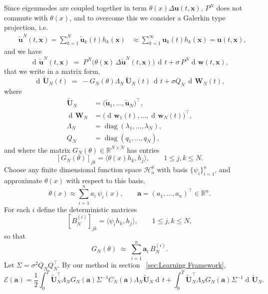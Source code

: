 \documentclass[11pt]{article} %
\def\rvu{{\mathbf{i}}}
\def\rvu{{\mathbf{u}}}
\def\rvw{{\mathbf{w}}}
\def\rvW{{\mathbf{W}}}
\def\rvx{{\mathbf{x}}}
\def\va{{\bm{a}}}
\def\gH{{\mathcal{H}}}
\newcommand{\R}{\mathbb{R}}
\DeclareMathOperator{\dif}{d \!}        %
\def\rvU{{\mathbf{U}}}
\newcommand{\inp}[1]{\langle #1 \rangle}
\newcommand{\loss}{\mathcal{E}}
\begin{document}
Since eigenmodes are coupled together in term $\theta(x)\Delta\rvu(t,\rvx)$, $P^N$ does not commute with $\theta(x)$, and to overcome this we consider a Galerkin type projection, i.e.
 \[
 \begin{aligned}
 &\tilde\rvu^N(t, \rvx) = \sum_{k = 1}^N\tilde\rvu_k(t)h_k(\rvx) &\approx \sum_{k = 1}^{\infty}\rvu_k(t)h_k(\rvx) = \rvu(t, \rvx), 
 \end{aligned}
 \]
and we have 
\begin{equation}\label{eq: Galerkin }
  \dif\tilde\rvu^{N}(t, \rvx)
  \;=\;
  P^{N}\!\bigl(\theta(\rvx)\,\Delta\tilde\rvu^N(t,\rvx)\bigr)\,\dif t
  +
  \sigma\,P^{N}\dif\rvw(t,\rvx),
\end{equation}
that we write in a matrix form,
\begin{equation}\label{eq:OU_tilde}
  \dif\tilde\rvU_N(t)
  \;=\;
  -G_{N}(\theta)\Lambda_{N}\,\tilde\rvU_N(t)\,\dif t
  + \sigma Q_{N}\,\dif\rvW_N(t),
\end{equation}
where
\begin{align}
\tilde\rvU_N &= \bigl(\tilde\rvu_{1},\dots,\tilde\rvu_{N}\bigr)^{\!\intercal}, \\
\dif\rvW_N &= \bigl(\dif\rvw_{1}(t),\dots,\dif\rvw_{N}(t)\bigr)^{\!\intercal}, \\
\Lambda_N &= \operatorname{diag}(\lambda_{1},\dots,\lambda_{N}), \\
Q_N &= \operatorname{diag}(q_{1},\dots,q_{N}),
\end{align}
and where the matrix
\(G_N(\theta)\in\R^{N\times N}\) has entries
\[
[G_{N}(\theta)]_{jk}=\inp{\theta(x)h_k, h_j},
\qquad 1\le j,k\le N.
\]
Choose any finite dimensional function space $\gH^\theta_n$ with basis 
\(\{\psi_{i}\}_{i=1}^{n}\), and approximate  $\theta(x)$ with respect to this basis, 
\[
\theta(x)\approx\sum_{i=1}^{n}a_{i}\,\psi_{i}(x),
\qquad \va=(a_{1},\dots,a_{n})^{\!\intercal}\in\R^{n}.
\]
For each \(i\) define the deterministic matrices
\begin{equation}\label{eq:B_matrices}
[B^{(i)}_N]_{jk}=\inp{\psi_i h_k, h_j},
\qquad 1\le j,k\le N,
\end{equation}
so that
\begin{equation}\label{eq:C_expand}
G_N(\theta)\;\approx\;\sum_{i=1}^{n}\va_{i}\,B^{(i)}_N.
\end{equation}
Let \(\Sigma=\sigma^{2}Q_NQ_N^{\intercal}\).
By our method in section ~\ref{sec:Learning Framework},
\begin{equation}\label{eq:loglik}
\loss(\va)
=\frac12\int_{0}^{T}
        \tilde{\rvU}^{\intercal}_N\Lambda_N G_N(\va)\Sigma^{-1}C_N(\va)\Lambda_N \tilde\rvU_N \dif t +  \int_{0}^{T}
        \tilde{\rvU}^{\intercal}_N\Lambda_N G_N(\va)\Sigma^{-1} \dif \tilde\rvU_N.
\end{equation}
\end{document}
